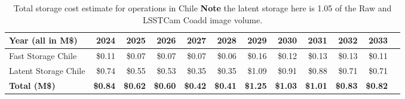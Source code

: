\tiny \begin{longtable} { |p{}  |r  |r  |r  |r  |r  |r  |r  |r  |r  |r  |r |} 
\caption{Total storage cost estimate for operations in Chile  {\bf Note} the latent storage here is 1.05 of the Raw and LSSTCam Coadd image volume. \label{tab:opsStorageChile}}\\ 
\hline 
\textbf{Year (all in M\$)}&\textbf{2024}&\textbf{2025}&\textbf{2026}&\textbf{2027}&\textbf{2028}&\textbf{2029}&\textbf{2030}&\textbf{2031}&\textbf{2032}&\textbf{2033} \\ \hline
{Fast Storage Chile}&{\$0.11}&{\$0.07}&{\$0.07}&{\$0.07}&{\$0.06}&{\$0.16}&{\$0.12}&{\$0.13}&{\$0.13}&{\$0.11} \\ \hline
{Latent Storage Chile}&{\$0.74}&{\$0.55}&{\$0.53}&{\$0.35}&{\$0.35}&{\$1.09}&{\$0.91}&{\$0.88}&{\$0.71}&{\$0.71} \\ \hline
\textbf{Total (M\$)}&\textbf{\$0.84}&\textbf{\$0.62}&\textbf{\$0.60}&\textbf{\$0.42}&\textbf{\$0.41}&\textbf{\$1.25}&\textbf{\$1.03}&\textbf{\$1.01}&\textbf{\$0.83}&\textbf{\$0.82} \\ \hline
\end{longtable} \normalsize
